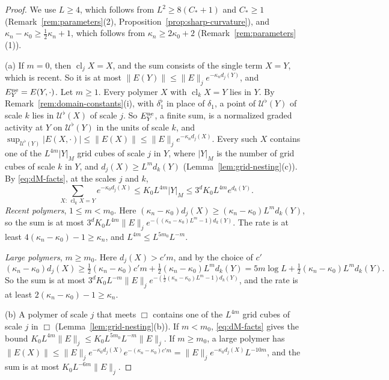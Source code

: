 \begin{proof}
We use $L\ge4$, which follows from $L^2\ge8(C_*+1)$ and $C_*\ge1$ (Remark~\ref{rem:parameters}(2), Proposition~\ref{prop:sharp-curvature}), and $\kappa_n-\kappa_0\ge\frac12\kappa_n+1$, which follows from $\kappa_n\ge2\kappa_0+2$ (Remark~\ref{rem:parameters}(1)).

(a) If $m=0$, then $\operatorname{cl}_jX=X$, and the sum consists of the single term $X=Y$, which is recent. So it is at most $\|E(Y)\|\le\|E\|_je^{-\kappa_nd_j(Y)}$, and $E^{\rm ne}_Y=E(Y,\cdot)$. Let $m\ge1$. Every polymer $X$ with $\operatorname{cl}_kX=Y$ lies in $Y$. By Remark~\ref{rem:domain-constants}(i), with $\delta_1^\flat$ in place of $\delta_1$, a point of $\mathcal U^\flat(Y)$ of scale $k$ lies in $\mathcal U^\flat(X)$ of scale $j$. So $E^{\rm ne}_Y$, a finite sum, is a normalized graded activity at $Y$ on $\mathcal U^\flat(Y)$ in the units of scale $k$, and $\sup_{\mathcal U^\flat(Y)}|E(X,\cdot)|\le\|E(X)\|\le\|E\|_je^{-\kappa_nd_j(X)}$. Every such $X$ contains one of the $L^{4m}|Y|_M$ grid cubes of scale $j$ in $Y$, where $|Y|_M$ is the number of grid cubes of scale $k$ in $Y$, and $d_j(X)\ge L^md_k(Y)$ (Lemma~\ref{lem:grid-nesting}(c)). By \eqref{eq:dM-facts}, at the scales $j$ and $k$,
\[
\sum_{X:\,\operatorname{cl}_kX=Y}e^{-\kappa_0d_j(X)}\le K_0L^{4m}|Y|_M\le3^dK_0L^{4m}e^{d_k(Y)} .
\]
\emph{Recent polymers}, $1\le m<m_0$. Here $(\kappa_n-\kappa_0)d_j(X)\ge(\kappa_n-\kappa_0)L^md_k(Y)$, so the sum is at most $3^dK_0L^{4m}\|E\|_je^{-((\kappa_n-\kappa_0)L^m-1)d_k(Y)}$. The rate is at least $4(\kappa_n-\kappa_0)-1\ge\kappa_n$, and $L^{4m}\le L^{5m_0}L^{-m}$.

\emph{Large polymers}, $m\ge m_0$. Here $d_j(X)>c'm$, and by the choice of $c'$
\[
(\kappa_n-\kappa_0)d_j(X)\ge\tfrac12(\kappa_n-\kappa_0)c'm+\tfrac12(\kappa_n-\kappa_0)L^md_k(Y)=5m\log L+\tfrac12(\kappa_n-\kappa_0)L^md_k(Y).
\]
So the sum is at most $3^dK_0L^{-m}\|E\|_je^{-(\frac12(\kappa_n-\kappa_0)L^m-1)d_k(Y)}$, and the rate is at least $2(\kappa_n-\kappa_0)-1\ge\kappa_n$.

(b) A polymer of scale $j$ that meets $\Box$ contains one of the $L^{4m}$ grid cubes of scale $j$ in $\Box$ (Lemma~\ref{lem:grid-nesting}(b)). If $m<m_0$, \eqref{eq:dM-facts} gives the bound $K_0L^{4m}\|E\|_j\le K_0L^{5m_0}L^{-m}\|E\|_j$. If $m\ge m_0$, a large polymer has $\|E(X)\|\le\|E\|_je^{-\kappa_0d_j(X)}e^{-(\kappa_n-\kappa_0)c'm}=\|E\|_je^{-\kappa_0d_j(X)}L^{-10m}$, and the sum is at most $K_0L^{-6m}\|E\|_j$.


\end{proof}
